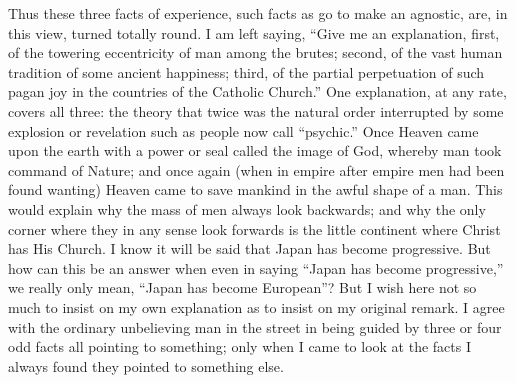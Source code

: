 \documentclass{book}
\begin{document}
Thus these three facts of experience, such facts as go to make an agnostic, are, in this view, turned totally round. I am left saying, “Give me an explanation, first, of the towering eccentricity of man among the brutes; second, of the vast human tradition of some ancient happiness; third, of the partial perpetuation of such pagan joy in the countries of the Catholic Church.” One explanation, at any rate, covers all three: the theory that twice was the natural order interrupted by some explosion or revelation such as people now call “psychic.” Once Heaven came upon the earth with a power or seal called the image of God, whereby man took command of Nature; and once again (when in empire after empire men had been found wanting) Heaven came to save mankind in the awful shape of a man. This would explain why the mass of men always look backwards; and why the only corner where they in any sense look forwards is the little continent where Christ has His Church. I know it will be said that Japan has become progressive. But how can this be an answer when even in saying “Japan has become progressive,” we really only mean, “Japan has become European”? But I wish here not so much to insist on my own explanation as to insist on my original remark. I agree with the ordinary unbelieving man in the street in being guided by three or four odd facts all pointing to something; only when I came to look at the facts I always found they pointed to something else.
\end{document}
